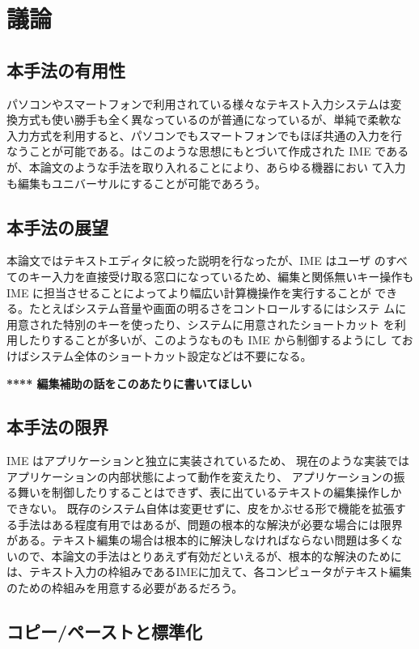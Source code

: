 \section{議論}

\subsection{本手法の有用性}
パソコンやスマートフォンで利用されている様々なテキスト入力システムは変
換方式も使い勝手も全く異なっているのが普通になっているが、単純で柔軟な
入力方式を利用すると、パソコンでもスマートフォンでもほぼ共通の入力を行
なうことが可能である。{\system}はこのような思想にもとづいて作成された IME
であるが、本論文のような手法を取り入れることにより、あらゆる機器におい
て入力も編集もユニバーサルにすることが可能であろう。

\subsection{本手法の展望}
本論文ではテキストエディタに絞った説明を行なったが、IME はユーザ
のすべてのキー入力を直接受け取る窓口になっているため、編集と関係無いキー操作も IME に担当させることによってより幅広い計算機操作を実行することが
できる。たとえばシステム音量や画面の明るさをコントロールするにはシステ
ムに用意された特別のキーを使ったり、システムに用意されたショートカット
を利用したりすることが多いが、このようなものも IME から制御するようにし
ておけばシステム全体のショートカット設定などは不要になる。

\textbf{**** 編集補助の話をこのあたりに書いてほしい}

\subsection{本手法の限界}

IME はアプリケーションと独立に実装されているため、
現在のような実装ではアプリケーションの内部状態によって動作を変えたり、
アプリケーションの振る舞いを制御したりすることはできず、表に出ているテキストの編集操作しか
できない。 既存のシステム自体は変更せずに、皮をかぶせる形で機能を拡張す
る手法はある程度有用ではあるが、問題の根本的な解決が必要な場合には限界
がある。テキスト編集の場合は根本的に解決しなければならない問題は多くな
いので、本論文の手法はとりあえず有効だといえるが、根本的な解決のために
は、テキスト入力の枠組みであるIMEに加えて、各コンピュータがテキスト編集
のための枠組みを用意する必要があるだろう。

\subsection{コピー/ペーストと標準化}


